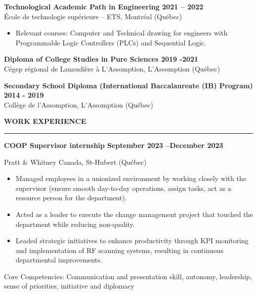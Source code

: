 \documentclass[letterpaper,11pt]{article}
\begin{document}
\textbf{Technological Academic Path in Engineering \hfill 2021 -- 2022}
\\École de technologie supérieure -- ETS, Montréal (Québec)

\begin{itemize}
\setlength{\itemsep}{-3pt}
\item
  Relevant courses: Computer and Technical drawing for engineers with
  Programmable Logic Controllers (PLCs) and Sequential Logic.
\end{itemize}

\textbf{Diploma of College Studies in Pure Sciences \hfill 2019 -2021}
\\
Cégep régional de Lanaudière à L'Assomption, L'Assomption (Québec)

\textbf{Secondary School Diploma (International Baccalaureate (IB)
Program) \hfill 2014 - 2019}
\\
Collège de l'Assomption, L'Assomption (Québec)


\newpage
\textbf{WORK EXPERIENCE}\par
\vspace{-20pt}
\rule{\textwidth}{0.4pt}
\textbf{COOP Supervisor internship \hfill September 2023 --December 2023}
\par
\vspace{-15pt}
Pratt \& Whitney Canada, St-Hubert (Québec)

\begin{itemize}
\setlength{\itemsep}{-3pt}
\item
  Managed employees in a unionized environment by working closely with
  the supervisor (ensure smooth day-to-day operations, assign tasks, act
  as a resource person for the department).
\item
  Acted as a leader to execute the change management project that touched the department while reducing non-quality. 
\item
Leaded strategic initiatives to enhance productivity through KPI monitoring and implementation of RF scanning systems, resulting in continuous departmental improvements.
\end{itemize}

Core Competencies: Communication and presentation skill, autonomy,
leadership, sense of priorities, initiative and diplomacy
\vspace{-5pt}
\end{document}
